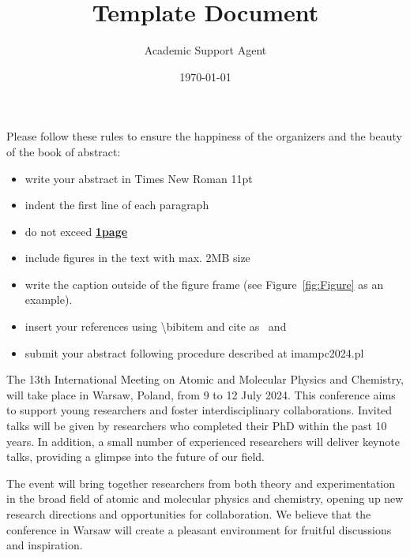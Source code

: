 \documentclass{article}
\title{Template Document}
\author{Academic Support Agent}
\date{\today}
\begin{document}
\maketitle




	Please follow these rules to ensure the happiness of the organizers and the beauty of the book of abstract: 
\begin{itemize}	
\item write your abstract in Times New Roman 11pt
\item indent the first line of each paragraph
\item do not exceed \textbf{\underline{1page}}
\item include figures in the text with max. 2MB size
\item write the caption outside of the figure frame (see Figure~\ref{fig:Figure} as an example). 
\item insert your references using \textbackslash bibitem and cite as~\cite{AuthorsAB2024} and ~\cite{AuthorsCDE2023}
\item submit your abstract following procedure described at imampc2024.pl
\end{itemize}

	The 13th International Meeting on Atomic and Molecular Physics and Chemistry, will take place in Warsaw, Poland, from 9 to 12 July 2024. This conference aims to support young researchers and foster interdisciplinary collaborations. Invited talks will be given by researchers who completed their PhD within the past 10 years. In addition, a small number of experienced researchers will deliver keynote talks, providing a glimpse into the future of our field.
	
	The event will bring together researchers from both theory and experimentation in the broad field of atomic and molecular physics and chemistry, opening up new research directions and opportunities for collaboration. We believe that the conference in Warsaw will create a pleasant environment for fruitful discussions and inspiration.
	
\end{document}
